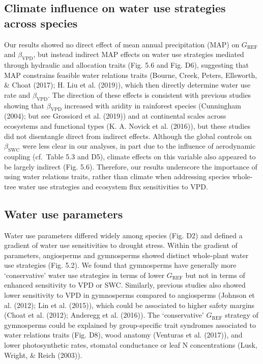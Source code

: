 \documentclass[11pt,twoside]{reedthesis}
\begin{document}
\subsection{Climate influence on water use strategies across
species}\label{climate-influence-on-water-use-strategies-across-species}

Our results showed no direct effect of mean annual precipitation (MAP)
on \(G_{\text{REF}}\) and \(\beta_{\text{VPD}}\), but instead indirect
MAP effects on water use strategies mediated through hydraulic and
allocation traits (Fig. 5.6 and Fig. D6), suggesting that MAP constrains
feasible water relations traits (Bourne, Creek, Peters, Ellsworth, \&
Choat (2017); H. Liu et al. (2019)), which then directly determine water
use rate and \(\beta_{\text{VPD}}\). The direction of these effects is
consistent with previous studies showing that \(\beta_{\text{VPD}}\)
increased with aridity in rainforest species (Cunningham (2004); but see
Grossiord et al. (2019)) and at continental scales across ecosystems and
functional types (K. A. Novick et al. (2016)), but these studies did not
disentangle direct from indirect effects. Although the global controls
on \(\beta_{\text{SWC}}\) were less clear in our analyses, in part due
to the influence of aerodynamic coupling (cf.~Table 5.3 and D5), climate
effects on this variable also appeared to be largely indirect (Fig.
5.6). Therefore, our results underscore the importance of using water
relations traits, rather than climate when addressing species whole-tree
water use strategies and ecosystem flux sensitivities to VPD.\par

\subsection{Water use parameters}\label{water-use-parameters}

Water use parameters differed widely among species (Fig. D2) and defined
a gradient of water use sensitivities to drought stress. Within the
gradient of parameters, angiosperms and gymnosperms showed distinct
whole-plant water use strategies (Fig. 5.2). We found that gymnosperms
have generally more `conservative' water use strategies in terms of
lower \(G_{\text{REF}}\) but not in terms of enhanced sensitivity to VPD
or SWC. Similarly, previous studies also showed lower sensitivity to VPD
in gymnosperms compared to angiosperms (Johnson et al. (2012); Lin et
al. (2015)), which could be associated to higher safety margins (Choat
et al. (2012); Anderegg et al. (2016)). The `conservative'
\(G_{\text{REF}}\) strategy of gymnosperms could be explained by
group-specific trait syndromes associated to water relations traits
(Fig. D8), wood anatomy (Venturas et al. (2017)), and lower
photosynthetic rates, stomatal conductance or leaf N concentrations
(Lusk, Wright, \& Reich (2003)).\par
\end{document}
